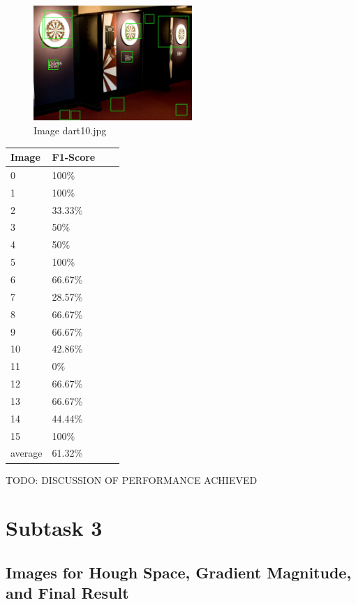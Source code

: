 \documentclass[conference]{IEEEtran}
\begin{document}
\begin{figure}[ht!]
	\centering
	\includegraphics[width=60mm]{img/Viola_Jones_Darts/detected_dart10.jpg}
	\caption{Image dart10.jpg \label{img_dart_10}}
\end{figure}

\begin{center}
	\begin{tabular}{| l | l | l | l |}
		\hline
		Image & F1-Score \\ \hline
	    0 & 100\% \\ \hline
		1 & 100\% \\ \hline
		2 & 33.33\% \\ \hline
		3 &  50\%\\ \hline
		4 & 50\% \\ \hline
		5 & 100\% \\ \hline
		6 & 66.67\% \\ \hline
		7 & 28.57\% \\ \hline
		8 & 66.67\% \\ \hline
		9 & 66.67\% \\ \hline
		10 & 42.86\% \\ \hline
		11 & 0\% \\ \hline
		12 & 66.67\% \\ \hline
		13 & 66.67\% \\ \hline
		14 & 44.44\% \\ \hline
		15 & 100\% \\ \hline
		average & 61.32\% \\ \hline
	\end{tabular}
\end{center}

TODO: DISCUSSION OF PERFORMANCE ACHIEVED

\newpage

\section{Subtask 3}

\subsection{Images for Hough Space, Gradient Magnitude, and Final Result}
\end{document}
